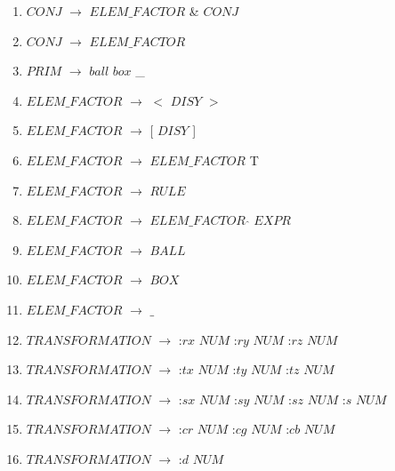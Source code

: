 \begin{enumerate}
\item $CONJ$   	$\rightarrow$  $ELEM\_FACTOR$ \& $CONJ$ \\
\item $CONJ$   	$\rightarrow$  $ELEM\_FACTOR$ \\

\item $PRIM$	$\rightarrow$	$ball$ \textbar $box$ \textbar \_ \\
\item $ELEM\_FACTOR$   	$\rightarrow$  $<$ $DISY$ $>$ \\
\item $ELEM\_FACTOR$   	$\rightarrow$  [ $DISY$ ] \\
\item $ELEM\_FACTOR$ 	$\rightarrow$  $ELEM\_FACTOR$ T \\
\item $ELEM\_FACTOR$ 	$\rightarrow$  $RULE$ \\
\item $ELEM\_FACTOR$   	$\rightarrow$  $ELEM\_FACTOR$ $\widehat{}$ $EXPR$\\


\item $ELEM\_FACTOR$   	$\rightarrow$  $BALL$\\
\item $ELEM\_FACTOR$   	$\rightarrow$  $BOX$\\
\item $ELEM\_FACTOR$   	$\rightarrow$  $\_$\\


\item $TRANSFORMATION$  $\rightarrow$   :$rx$ $NUM$ \textbar :$ry$ $NUM$ \textbar :$rz$ $NUM$ \\
\item $TRANSFORMATION$	$\rightarrow$	:$tx$ $NUM$ \textbar :$ty$ $NUM$ \textbar :$tz$ $NUM$ \\
\item $TRANSFORMATION$	$\rightarrow$	:$sx$ $NUM$ \textbar :$sy$ $NUM$ \textbar :$sz$ $NUM$ \textbar :$s$ $NUM$ \\
\item $TRANSFORMATION$ 	$\rightarrow$	:$cr$ $NUM$ \textbar :$cg$ $NUM$ \textbar :$cb$ $NUM$ \\
\item $TRANSFORMATION$	$\rightarrow$	:$d$  $NUM$ \\



\end{enumerate}

\noindent
